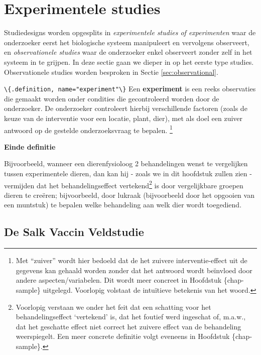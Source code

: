 \documentclass[
  12pt,dutch,coursenotes]{book}
\newcommand{\passthrough}[1]{#1}
\begin{document}
\hypertarget{experimentele-studies}{%
\section{Experimentele studies}\label{experimentele-studies}}

Studiedesigns worden opgesplits in \emph{experimentele studies of experimenten} waar de onderzoeker eerst het biologische systeem manipuleert en vervolgens observeert, en \emph{observationele studies} waar de onderzoeker enkel observeert zonder zelf in het systeem in te grijpen. In deze sectie gaan we dieper in op het eerste type studies. Observationele studies worden besproken in Sectie \ref{sec:observational}.

\passthrough{\lstinline!\{.definition, name="experiment"\}!}
Een \textbf{experiment} is een reeks observaties die gemaakt worden onder
condities die gecontroleerd worden door de onderzoeker. De onderzoeker
controleert hierbij verschillende factoren (zoals de keuze van de
interventie voor een locatie, plant, dier), met als doel een zuiver antwoord op de gestelde onderzoeksvraag te bepalen.
\footnote{Met ``zuiver'' wordt hier bedoeld dat de het zuivere interventie-effect uit de gegevens
  kan gehaald worden zonder dat het antwoord wordt beïnvloed door andere aspecten/variabelen. Dit wordt meer concreet in Hoofdstuk \{chap-sample\}
  uitgelegd. Voorlopig volstaat de intuïtieve betekenis van het woord.}

\textbf{Einde definitie}

Bijvoorbeeld, wanneer een dierenfysioloog 2 behandelingen wenst te vergelijken tussen experimentele dieren,
dan kan hij - zoals we in dit hoofdstuk zullen zien - vermijden dat het
behandelingseffect vertekend\footnote{ Voorlopig verstaan we onder het feit dat een schatting voor het
  behandelingseffect `vertekend' is, dat het foutief werd ingeschat of, m.a.w., dat het geschatte effect niet correct het zuivere effect van de behandeling weerspiegelt. Een meer concrete definitie volgt eveneens in
  Hoofdstuk \{chap-sample\}.} is door vergelijkbare groepen dieren te creëren;
bijvoorbeeld, door lukraak (bijvoorbeeld door
het opgooien van een muntstuk) te bepalen welke behandeling aan welk
dier wordt toegediend.

\hypertarget{de-salk-vaccin-veldstudie}{%
\subsection{De Salk Vaccin Veldstudie}\label{de-salk-vaccin-veldstudie}}
\end{document}
